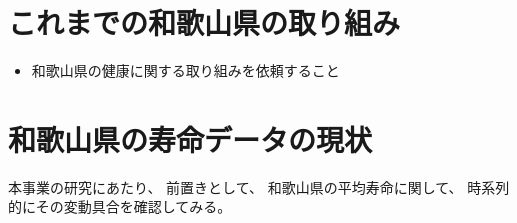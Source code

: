 %






%



%
%
%









\chapter{これまでの和歌山県の取り組み}



\begin{itemize}
\item 和歌山県の健康に関する取り組みを依頼すること
\end{itemize}






\chapter{和歌山県の寿命データの現状}


本事業の研究にあたり、
前置きとして、
和歌山県の平均寿命に関して、
時系列的にその変動具合を確認してみる。


